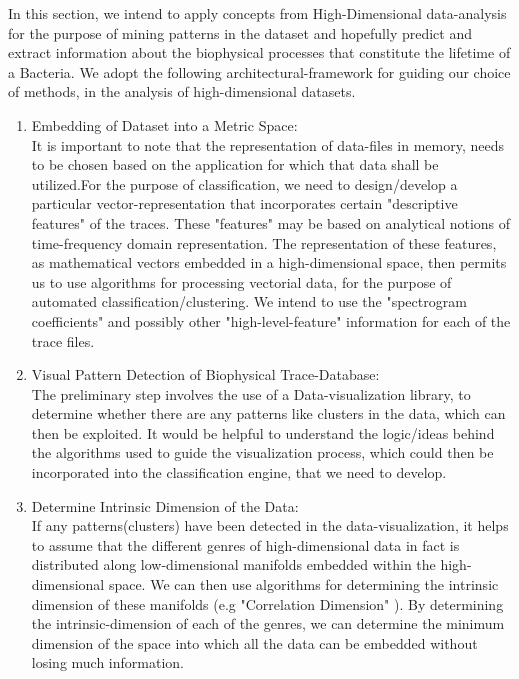 \documentclass[10pt]{article}
\begin{document}
In this section, we intend to apply concepts from High-Dimensional data-analysis for the purpose of mining patterns in the dataset and hopefully predict and extract information about the biophysical processes that constitute the lifetime of a Bacteria. We adopt the following architectural-framework for guiding our choice of methods, in the analysis of high-dimensional datasets. 
\begin{enumerate}
\item Embedding of Dataset into a Metric Space:\\
It is important to note that the representation of data-files in memory, needs to be chosen based on the application for which that data shall be utilized.For the purpose of classification, we need to design/develop a particular vector-representation that incorporates certain "descriptive features" of the traces. These "features" may be based on analytical notions of time-frequency domain representation. The representation of these features, as mathematical vectors embedded in a high-dimensional space, then permits us to use algorithms for processing vectorial data, for the purpose of automated classification/clustering. We intend to use the "spectrogram coefficients" and possibly other "high-level-feature" information for each of the trace files. 

\item Visual Pattern Detection of Biophysical Trace-Database: \\
The preliminary step involves the use of a Data-visualization library, to determine whether there are any patterns like clusters in the data, which can then be exploited. It would be helpful to understand the logic/ideas behind the algorithms used to guide the visualization process, which could then be incorporated into the classification engine, that we need to develop. 

\item Determine Intrinsic Dimension of the Data:\\
If any patterns(clusters) have been detected in the data-visualization, it helps to assume that the different genres of high-dimensional data in fact is distributed along low-dimensional manifolds embedded within the high-dimensional space. We can then use algorithms for determining the intrinsic dimension of these manifolds (e.g "Correlation Dimension" ). By determining the intrinsic-dimension of each of the genres, we can determine the minimum dimension of the space into which all the data can be embedded without losing much information. 


\end{enumerate}
\end{document}
